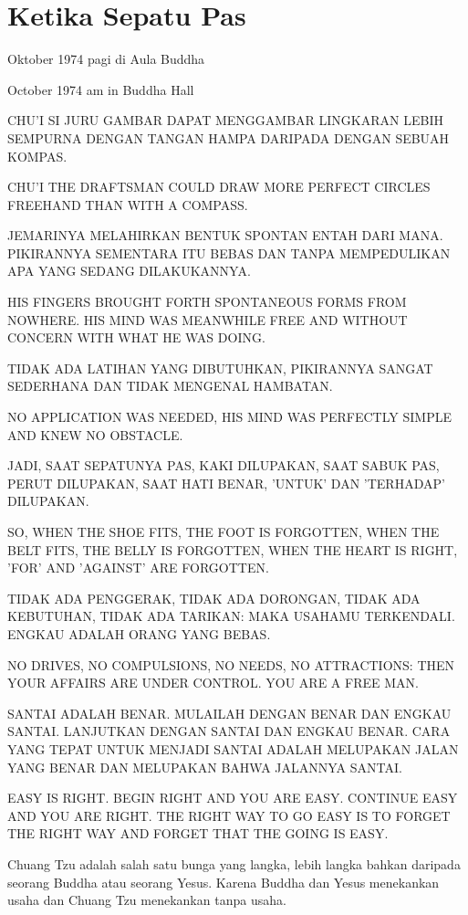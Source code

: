 \chapter{Ketika Sepatu Pas}

 Oktober 1974 pagi di Aula Buddha

 October 1974 am in Buddha Hall

\bahasa
CHU'I SI JURU GAMBAR DAPAT MENGGAMBAR LINGKARAN LEBIH SEMPURNA DENGAN TANGAN HAMPA DARIPADA DENGAN SEBUAH KOMPAS.

\english
CHU'I THE DRAFTSMAN COULD DRAW MORE PERFECT CIRCLES FREEHAND THAN WITH A COMPASS.

\bahasa
JEMARINYA MELAHIRKAN BENTUK SPONTAN ENTAH DARI MANA. PIKIRANNYA SEMENTARA ITU BEBAS DAN TANPA MEMPEDULIKAN APA YANG SEDANG DILAKUKANNYA.

\english
HIS FINGERS BROUGHT FORTH SPONTANEOUS FORMS FROM NOWHERE. HIS MIND WAS MEANWHILE FREE AND WITHOUT CONCERN WITH WHAT HE WAS DOING.

\bahasa
TIDAK ADA LATIHAN YANG DIBUTUHKAN, PIKIRANNYA SANGAT SEDERHANA DAN TIDAK MENGENAL HAMBATAN.

\english
NO APPLICATION WAS NEEDED, HIS MIND WAS PERFECTLY SIMPLE AND KNEW NO OBSTACLE.

\bahasa
JADI, SAAT SEPATUNYA PAS, KAKI DILUPAKAN, SAAT SABUK PAS, PERUT DILUPAKAN, SAAT HATI BENAR, 'UNTUK' DAN 'TERHADAP' DILUPAKAN.

\english
SO, WHEN THE SHOE FITS, THE FOOT IS FORGOTTEN, WHEN THE BELT FITS, THE BELLY IS FORGOTTEN, WHEN THE HEART IS RIGHT, 'FOR' AND 'AGAINST' ARE FORGOTTEN.

\bahasa
TIDAK ADA PENGGERAK, TIDAK ADA DORONGAN, TIDAK ADA KEBUTUHAN, TIDAK ADA TARIKAN: MAKA USAHAMU TERKENDALI. ENGKAU ADALAH ORANG YANG BEBAS.

\english
NO DRIVES, NO COMPULSIONS, NO NEEDS, NO ATTRACTIONS: THEN YOUR AFFAIRS ARE UNDER CONTROL. YOU ARE A FREE MAN.

\bahasa
SANTAI ADALAH BENAR. MULAILAH DENGAN BENAR DAN ENGKAU SANTAI. LANJUTKAN DENGAN SANTAI DAN ENGKAU BENAR. CARA YANG TEPAT UNTUK MENJADI SANTAI ADALAH MELUPAKAN JALAN YANG BENAR DAN MELUPAKAN BAHWA JALANNYA SANTAI.

\english
EASY IS RIGHT. BEGIN RIGHT AND YOU ARE EASY. CONTINUE EASY AND YOU ARE RIGHT. THE RIGHT WAY TO GO EASY IS TO FORGET THE RIGHT WAY AND FORGET THAT THE GOING IS EASY.

\bahasa
Chuang Tzu adalah salah satu bunga yang langka, lebih langka bahkan daripada seorang Buddha atau seorang Yesus. Karena Buddha dan Yesus menekankan usaha dan Chuang Tzu menekankan tanpa usaha.

